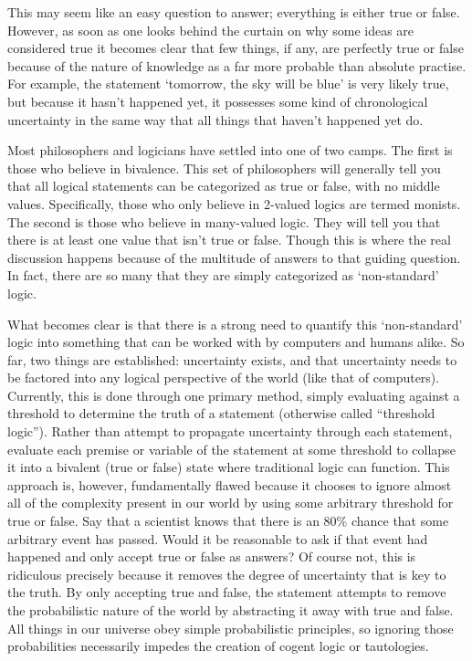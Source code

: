 \documentclass{article}
\begin{document}
This may seem like an easy question to answer; everything is either true or false. However, as soon as one looks behind the curtain on why some ideas are considered true it becomes clear that few things, if any, are perfectly true or false because of the nature of knowledge as a far more probable than absolute practise. For example, the statement ‘tomorrow, the sky will be blue’ is very likely true, but because it hasn’t happened yet, it possesses some kind of chronological uncertainty in the same way that all things that haven’t happened yet do. 

Most philosophers and logicians have settled into one of two camps. The first is those who believe in bivalence. This set of philosophers will generally tell you that all logical statements can be categorized as true or false, with no middle values. Specifically, those who only believe in 2-valued logics are termed monists. The second is those who believe in many-valued logic. They will tell you that there is at least one value that isn’t true or false. Though this is where the real discussion happens because of the multitude of answers to that guiding question. In fact, there are so many that they are simply categorized as ‘non-standard’ logic. 

What becomes clear is that there is a strong need to quantify this ‘non-standard’ logic into something that can be worked with by computers and humans alike. So far, two things are established: uncertainty exists, and that uncertainty needs to be factored into any logical perspective of the world (like that of computers). Currently, this is done through one primary method, simply evaluating against a threshold to determine the truth of a statement (otherwise called “threshold logic”). Rather than attempt to propagate uncertainty through each statement, evaluate each premise or variable of the statement at some threshold to collapse it into a bivalent (true or false) state where traditional logic can function. This approach is, however, fundamentally flawed because it chooses to ignore almost all of the complexity present in our world by using some arbitrary threshold for true or false. Say that a scientist knows that there is an 80\% chance that some arbitrary event has passed. Would it be reasonable to ask if that event had happened and only accept true or false as answers? Of course not, this is ridiculous precisely because it removes the degree of uncertainty that is key to the truth. By only accepting true and false, the statement attempts to remove the probabilistic nature of the world by abstracting it away with true and false. All things in our universe obey simple probabilistic principles, so ignoring those probabilities necessarily impedes the creation of cogent logic or tautologies.
\end{document}
